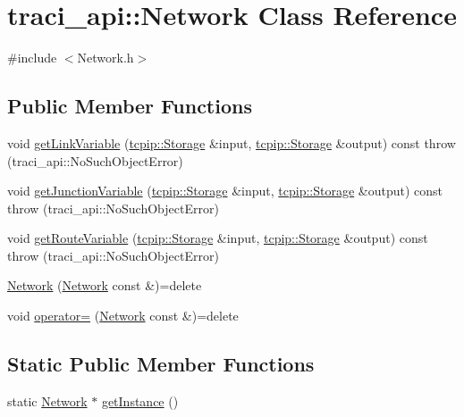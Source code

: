\hypertarget{classtraci__api_1_1_network}{}\section{traci\+\_\+api\+:\+:Network Class Reference}
\label{classtraci__api_1_1_network}


{\ttfamily \#include $<$Network.\+h$>$}

\subsection*{Public Member Functions}
\begin{DoxyCompactItemize}
\item 
void \hyperlink{classtraci__api_1_1_network_a8a82aa15b0422ce28ca240e88c1af4f7}{get\+Link\+Variable} (\hyperlink{classtcpip_1_1_storage}{tcpip\+::\+Storage} \&input, \hyperlink{classtcpip_1_1_storage}{tcpip\+::\+Storage} \&output) const  throw (traci\+\_\+api\+::\+No\+Such\+Object\+Error)
\item 
void \hyperlink{classtraci__api_1_1_network_a9bfe4236d1ab692d47133c69406811b3}{get\+Junction\+Variable} (\hyperlink{classtcpip_1_1_storage}{tcpip\+::\+Storage} \&input, \hyperlink{classtcpip_1_1_storage}{tcpip\+::\+Storage} \&output) const  throw (traci\+\_\+api\+::\+No\+Such\+Object\+Error)
\item 
void \hyperlink{classtraci__api_1_1_network_abc0574b41332ec15856e2e5bb9926be9}{get\+Route\+Variable} (\hyperlink{classtcpip_1_1_storage}{tcpip\+::\+Storage} \&input, \hyperlink{classtcpip_1_1_storage}{tcpip\+::\+Storage} \&output) const  throw (traci\+\_\+api\+::\+No\+Such\+Object\+Error)
\item 
\hyperlink{classtraci__api_1_1_network_a59991f6688c5c41ff4f3a5b9c941d952}{Network} (\hyperlink{classtraci__api_1_1_network}{Network} const \&)=delete
\item 
void \hyperlink{classtraci__api_1_1_network_ae6ac9267db1ace8c368a48a7b92ce964}{operator=} (\hyperlink{classtraci__api_1_1_network}{Network} const \&)=delete
\end{DoxyCompactItemize}
\subsection*{Static Public Member Functions}
\begin{DoxyCompactItemize}
\item 
static \hyperlink{classtraci__api_1_1_network}{Network} $\ast$ \hyperlink{classtraci__api_1_1_network_ab6c12d9fa0affbeeb0d068544adb4724}{get\+Instance} ()
\end{DoxyCompactItemize}


